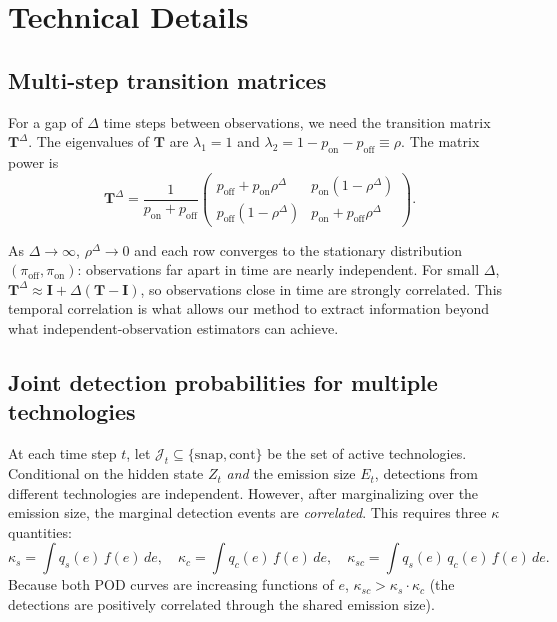 \documentclass[11pt]{article}
\begin{document}
\section{Technical Details}
\label{sec:details}

\subsection{Multi-step transition matrices}
\label{sec:multistep}

For a gap of $\Delta$ time steps between observations, we need the transition matrix $\mathbf{T}^\Delta$. The eigenvalues of $\mathbf{T}$ are $\lambda_1 = 1$ and $\lambda_2 = 1 - p_{\text{on}} - p_{\text{off}} \equiv \rho$. The matrix power is
\begin{equation}
    \mathbf{T}^\Delta = \frac{1}{p_{\text{on}} + p_{\text{off}}} 
    \begin{pmatrix} 
        p_{\text{off}} + p_{\text{on}} \rho^\Delta & p_{\text{on}}(1 - \rho^\Delta) \\ 
        p_{\text{off}}(1 - \rho^\Delta) & p_{\text{on}} + p_{\text{off}} \rho^\Delta 
    \end{pmatrix}.
\end{equation}

As $\Delta \to \infty$, $\rho^\Delta \to 0$ and each row converges to the stationary distribution $(\pi_{\text{off}}, \pi_{\text{on}})$: observations far apart in time are nearly independent. For small $\Delta$, $\mathbf{T}^\Delta \approx \mathbf{I} + \Delta(\mathbf{T} - \mathbf{I})$, so observations close in time are strongly correlated. This temporal correlation is what allows our method to extract information beyond what independent-observation estimators can achieve.

\subsection{Joint detection probabilities for multiple technologies}
\label{sec:multitech}

At each time step $t$, let $\mathcal{J}_t \subseteq \{\text{snap}, \text{cont}\}$ be the set of active technologies. Conditional on the hidden state $Z_t$ \emph{and} the emission size $E_t$, detections from different technologies are independent. However, after marginalizing over the emission size, the marginal detection events are \emph{correlated}. This requires three $\kappa$ quantities:
\begin{equation}
    \kappa_s = \int q_s(e)\, f(e)\, de, \quad
    \kappa_c = \int q_c(e)\, f(e)\, de, \quad
    \kappa_{sc} = \int q_s(e)\, q_c(e)\, f(e)\, de.
\end{equation}
Because both POD curves are increasing functions of $e$, $\kappa_{sc} > \kappa_s \cdot \kappa_c$ (the detections are positively correlated through the shared emission size).
\end{document}
